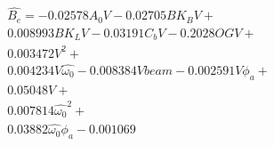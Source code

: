 \begin{equation} \label{eq:polynom_complex}
\begin{aligned} 
 \hat{B_e} = - 0.02578 A_{0} V - 0.02705 BK_{B} V + \\ 
 0.008993 BK_{L} V - 0.03191 C_{b} V - 0.2028 OG V + \\ 
 0.003472 V^{2} + \\ 
 0.004234 V \hat{\omega_0} - 0.008384 V beam - 0.002591 V \phi_{a} + \\ 
 0.05048 V + \\ 
 0.007814 \hat{\omega_0}^{2} + \\ 
 0.03882 \hat{\omega_0} \phi_{a} - 0.001069 \\ 
 \end{aligned}
\end{equation}
